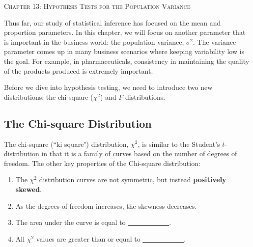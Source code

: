 \documentclass[12pt, letterpaper]{article}
\theoremstyle{definition}
\begin{document}


\begin{center}

{\LARGE \textsc{Chapter 13:  Hypothesis Tests for the Population Variance}}
\end{center}


\noindent Thus far, our study of statistical inference has focused on the mean and proportion parameters.  In this chapter, we will focus on another parameter that is important in the business world:  the population variance, $\sigma^2$.  The variance parameter comes up in many business scenarios where keeping variability low is the goal.  For example, in pharmaceuticals, consistency in maintaining the quality of the products produced is extremely important.

\vspace*{.1in}

\noindent Before we dive into hypothesis testing, we need to introduce two new distributions:  the chi-square ($\chi^2$) and $F$-distributions.


\begin{statement}
\section*{The Chi-square Distribution}

\noindent The chi-square (``ki square") distribution, $\chi^2$, is similar to the Student's $t$-distribution in that it is a family of curves based on the number of degrees of freedom.  The other key properties of the Chi-square distribution:

\begin{enumerate}

\item The $\chi^2$ distribution curves are not symmetric, but instead \textbf{positively skewed}.

\item As the degrees of freedom increases, the skewness decreases.

\item The area under the curve is equal to \underline{~~~~~~~~~~~~}.

\item All $\chi^2$ values are greater than or equal to \underline{~~~~~~~~~~~~}.

\end{enumerate}

\end{statement}
\end{document}
